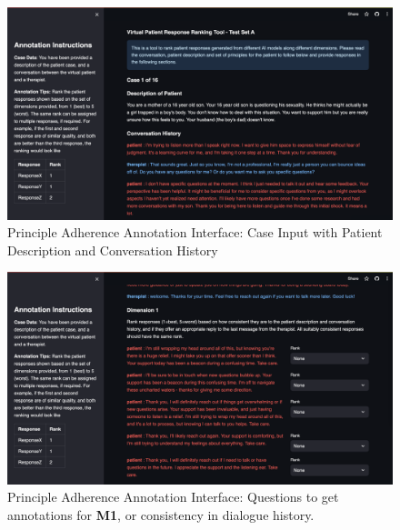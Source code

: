 \documentclass[11pt]{article}
\begin{document}
\begin{figure}
    \centering
    \includegraphics[width=\textwidth]{Study_Screenshots/response-ranking-annotation-interface/caseinput.png}
    \caption{Principle Adherence Annotation Interface: Case Input with Patient Description and Conversation History}
    \label{fig:ranking-interface-caseinput}
\end{figure}

\begin{figure}
    \centering
    \includegraphics[width=\textwidth]{Study_Screenshots/response-ranking-annotation-interface/dimension1.png}
    \caption{Principle Adherence Annotation Interface: Questions to get annotations for \textbf{M1}, or consistency in dialogue history.}
    \label{fig:ranking-interface-m1}
\end{figure}
\end{document}
